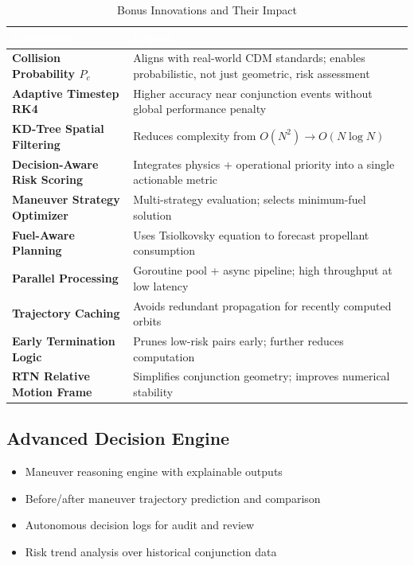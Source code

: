 \documentclass[11pt, a4paper]{article}
\begin{document}
\begin{table}[H]
\centering
\small
\begin{tabularx}{\linewidth}{>{\bfseries}p{4.8cm} X}
\toprule
\rowcolor{spaceblue}\textcolor{white}{\textbf{Innovation}} & \textcolor{white}{\textbf{Impact}} \\
\midrule
Collision Probability $P_c$ & Aligns with real-world CDM standards; enables probabilistic, not just geometric, risk assessment \\
\midrule
Adaptive Timestep RK4 & Higher accuracy near conjunction events without global performance penalty \\
\midrule
KD-Tree Spatial Filtering & Reduces complexity from $O(N^2) \to O(N \log N)$ \\
\midrule
Decision-Aware Risk Scoring & Integrates physics + operational priority into a single actionable metric \\
\midrule
Maneuver Strategy Optimizer & Multi-strategy evaluation; selects minimum-fuel solution \\
\midrule
Fuel-Aware Planning & Uses Tsiolkovsky equation to forecast propellant consumption \\
\midrule
Parallel Processing & Goroutine pool + async pipeline; high throughput at low latency \\
\midrule
Trajectory Caching & Avoids redundant propagation for recently computed orbits \\
\midrule
Early Termination Logic & Prunes low-risk pairs early; further reduces computation \\
\midrule
RTN Relative Motion Frame & Simplifies conjunction geometry; improves numerical stability \\
\bottomrule
\end{tabularx}
\caption{Bonus Innovations and Their Impact}
\end{table}

\subsection{Advanced Decision Engine}

\begin{itemize}[leftmargin=1.5cm]
  \item Maneuver reasoning engine with explainable outputs
  \item Before/after maneuver trajectory prediction and comparison
  \item Autonomous decision logs for audit and review
  \item Risk trend analysis over historical conjunction data
\end{itemize}
\end{document}
